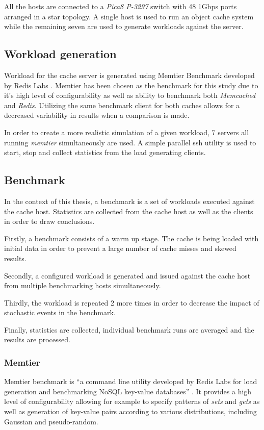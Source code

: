 All the hosts are connected to a \textit{Pica8 P-3297} switch with 48 1Gbps ports arranged in a star topology. A single host is used to run an object cache system while the remaining seven are used to generate workloads against the server.

\subsection{Workload generation}
\label{methodology:workload-gen}
Workload for the cache server is generated using Memtier Benchmark developed by Redis Labs \cite{memtier}. Memtier has been chosen as the benchmark for this study due to it's high level of configurability as well as ability to benchmark both \textit{Memcached} and \textit{Redis}. Utilizing the same benchmark client for both caches allows for a decreased variability in results when a comparison is made.

In order to create a more realistic simulation of a given workload, 7 servers all running \textit{memtier} simultaneously are used. A simple parallel ssh utility is used to start, stop and collect statistics from the load generating clients.

\subsection{Benchmark}

In the context of this thesis, a benchmark is a set of workloads executed against the cache host. Statistics are collected from the cache host as well as the clients in order to draw conclusions.

Firstly, a benchmark consists of a warm up stage. The cache is being loaded with initial data in order to prevent a large number of cache misses and skewed results.

Secondly, a configured workload is generated and issued against the cache host from multiple benchmarking hosts simultaneously.

Thirdly, the workload is repeated 2 more times in order to decrease the impact of stochastic events in the benchmark.

Finally, statistics are collected, individual benchmark runs are averaged and the results are processed.



\subsubsection{Memtier}
Memtier benchmark is ``a command line utility developed by Redis Labs for load generation and benchmarking NoSQL key-value databases'' \cite{memtier}. It provides a high level of configurability allowing for example to specify patterns of \textit{sets} and \textit{gets} as well as generation of key-value pairs according to various distributions, including Gaussian and pseudo-random.

